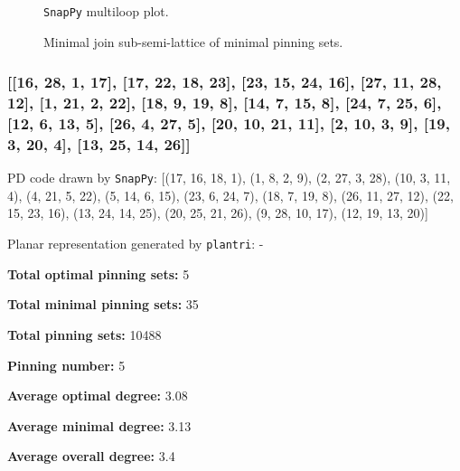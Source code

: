 \documentclass{article}%
\begin{document}
\begin{multicols}{2}
\begin{figure}[H]
\centering

\caption{\texttt{SnapPy} multiloop plot.}
\label{fig:tex/img/[[24, 19, 1, 20], [20, 11, 21, 12], [8, 23, 9, 24], [9, 18, 10, 19], [1, 10, 2, 11], [21, 6, 22, 7], [12, 7, 13, 8], [13, 22, 14, 23], [17, 2, 18, 3], [5, 28, 6, 25], [14, 28, 15, 27], [3, 27, 4, 26],.svg}
\end{figure}
\columnbreak

\begin{figure}[H]
\centering
\scalebox{0.8}{}
\caption{Minimal join sub-semi-lattice of minimal pinning sets.}
\label{fig:tex/img/[[24, 19, 1, 20], [20, 11, 21, 12], [8, 23, 9, 24], [9, 18, 10, 19], [1, 10, 2, 11], [21, 6, 22, 7], [12, 7, 13, 8], [13, 22, 14, 23], [17, 2, 18, 3], [5, 28, 6, 25], [14, 28, 15, 27], [3, 27, 4, 26],.pgf}
\end{figure}
\end{multicols}

\newpage

\subsubsection{[[16, 28, 1, 17], [17, 22, 18, 23], [23, 15, 24, 16], [27, 11, 28, 12], [1, 21, 2, 22], [18, 9, 19, 8], [14, 7, 15, 8], [24, 7, 25, 6], [12, 6, 13, 5], [26, 4, 27, 5], [20, 10, 21, 11], [2, 10, 3, 9], [19, 3, 20, 4], [13, 25, 14, 26]]}

{\small\noindent PD code drawn by \texttt{SnapPy}: [(17, 16, 18, 1), (1, 8, 2, 9), (2, 27, 3, 28), (10, 3, 11, 4), (4, 21, 5, 22), (5, 14, 6, 15), (23, 6, 24, 7), (18, 7, 19, 8), (26, 11, 27, 12), (22, 15, 23, 16), (13, 24, 14, 25), (20, 25, 21, 26), (9, 28, 10, 17), (12, 19, 13, 20)]}

{\small\noindent Planar representation generated by \texttt{plantri}: -}

\begin{multicols}{2}
{\normalsize \noindent\textbf{Total optimal pinning sets:} 5

\noindent\textbf{Total minimal pinning sets:} 35

\noindent\textbf{Total pinning sets:} 10488

\noindent\textbf{Pinning number:} 5

}
\columnbreak

{\normalsize \noindent\textbf{Average optimal degree:} 3.08

\noindent\textbf{Average minimal degree:} 3.13

\noindent\textbf{Average overall degree:} 3.4

}
\end{multicols}
\end{document}
